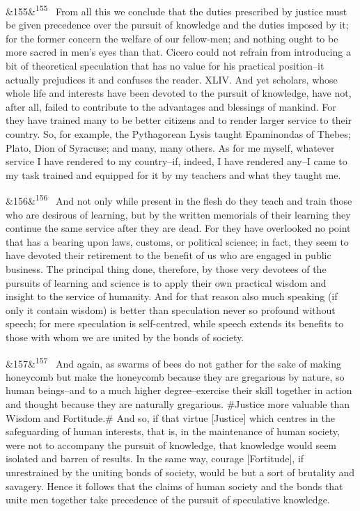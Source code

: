 \documentclass[12pt]{article}
\newcommand{\para}[1][]{\par\noindent\ifx&#1&\else\textsuperscript{\footnotesize #1}~\fi}
\begin{document}
\para[155] From all this we conclude that the duties prescribed by justice must be given precedence over the pursuit of knowledge and the duties imposed by it; for the former concern the welfare of our fellow-men; and nothing ought to be more sacred in men's eyes than that. Cicero could not refrain from introducing a bit of theoretical speculation that has no value for his practical position--it actually prejudices it and confuses the reader. XLIV. And yet scholars, whose whole life and interests have been devoted to the pursuit of knowledge, have not, after all, failed to contribute to the advantages and blessings of mankind. For they have trained many to be better citizens and to render larger service to their country. So, for example, the Pythagorean Lysis taught Epaminondas of Thebes; Plato, Dion of Syracuse; and many, many others. As for me myself, whatever service I have rendered to my country--if, indeed, I have rendered any--I came to my task trained and equipped for it by my teachers and what they taught me.

\para[156] And not only while present in the flesh do they teach and train those who are desirous of learning, but by the written memorials of their learning they continue the same service after they are dead. For they have overlooked no point that has a bearing upon laws, customs, or political science; in fact, they seem to have devoted their retirement to the benefit of us who are engaged in public business. The principal thing done, therefore, by those very devotees of the pursuits of learning and science is to apply their own practical wisdom and insight to the service of humanity. And for that reason also much speaking (if only it contain wisdom) is better than speculation never so profound without speech; for mere speculation is self-centred, while speech extends its benefits to those with whom we are united by the bonds of society.

\para[157] And again, as swarms of bees do not gather for the sake of making honeycomb but make the honeycomb because they are gregarious by nature, so human beings--and to a much higher degree--exercise their skill together in action and thought because they are naturally gregarious. \#Justice more valuable than Wisdom and Fortitude.\# And so, if that virtue [Justice] which centres in the safeguarding of human interests, that is, in the maintenance of human society, were not to accompany the pursuit of knowledge, that knowledge would seem isolated and barren of results. In the same way, courage [Fortitude], if unrestrained by the uniting bonds of society, would be but a sort of brutality and savagery. Hence it follows that the claims of human society and the bonds that unite men together take precedence of the pursuit of speculative knowledge.
\end{document}
